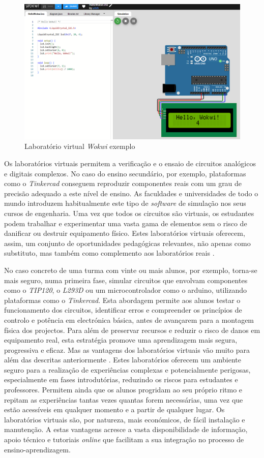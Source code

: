 \begin{figure}[hbtp]
    \centering
    \includegraphics[width=0.6\linewidth]{figures/wokwi.png}
    \caption{Laboratório virtual \textit{Wokwi} exemplo}
    \label{fig:wokwi}
\end{figure}

Os laboratórios virtuais permitem a verificação e o ensaio de circuitos analógicos e digitais complexos. No caso do ensino secundário, por exemplo, plataformas como o \textit{Tinkercad} conseguem reproduzir componentes reais com um grau de precisão adequado a este nível de ensino. As faculdades e universidades de todo o mundo introduzem habitualmente este tipo de \textit{software} de simulação nos seus cursos de engenharia. Uma vez que todos os circuitos são virtuais, os estudantes podem trabalhar e experimentar uma vasta gama de elementos sem o risco de danificar ou destruir equipamento físico. Estes laboratórios virtuais oferecem, assim, um conjunto de oportunidades pedagógicas relevantes, não apenas como substituto, mas também como complemento aos laboratórios reais \cite{WebBrowserSimulators}. 

No caso concreto de uma turma com vinte ou mais alunos, por exemplo, torna-se mais seguro, numa primeira fase, simular circuitos que envolvam componentes como o \textit{TIP120}, o \textit{L293D} ou um microcontrolador como o \gls{arduino}, utilizando plataformas como o \textit{Tinkercad}. Esta abordagem permite aos alunos testar o funcionamento dos circuitos, identificar erros e compreender os princípios de controlo e potência em electrónica básica, antes de avançarem para a montagem física dos projectos. Para além de preservar recursos e reduzir o risco de danos em equipamento real, esta estratégia promove uma aprendizagem mais segura, progressiva e eficaz. Mas as vantagens dos laboratórios virtuais vão muito para além das descritas anteriormente \cite{scheckler, lynch, BlogeMas95, vabtegensVL}. Estes laboratórios oferecem um ambiente seguro para a realização de experiências complexas e potencialmente perigosas, especialmente em fases introdutórias, reduzindo os riscos para estudantes e professores. Permitem ainda que os alunos progridam ao seu próprio ritmo e repitam as experiências tantas vezes quantas forem necessárias, uma vez que estão acessíveis em qualquer momento e a partir de qualquer lugar. Os laboratórios virtuais são, por natureza, mais económicos, de fácil instalação e manutenção. A estas vantagens acresce a vasta disponibilidade de informação, apoio técnico e tutoriais \textit{online} que facilitam a sua integração no processo de ensino-aprendizagem.

